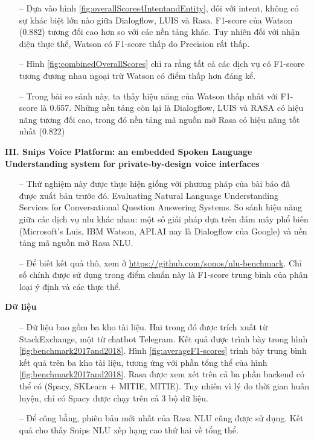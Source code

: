 \begin{itemize}
    \item[--] Dựa vào hình \ref{fig:overallScores4IntentandEntity}, đối với intent, không có sự khác biệt lớn nào giữa Dialogflow, LUIS và Rasa. F1-score của Watson (0.882) tương đối cao hơn so với các nền tảng khác. Tuy nhiên đối với nhận diện thực thể, Watson có F1-score thấp do Precision rất thấp.
    \item[--] Hình \ref{fig:combinedOverallScores} chỉ ra rằng tất cả các dịch vụ có F1-score tương đương nhau ngoại trừ Watson có điểm thấp hơn đáng kể.
    \item[--] Trong bài so sánh này, ta thấy hiệu năng của Watson thấp nhất với F1-score là 0.657. Những nền tảng còn lại là Dialogflow, LUIS và RASA có hiệu năng tương đối cao, trong đó nền tảng mã nguồn mở Rasa có hiệu năng tốt nhất (0.822)
\end{itemize}

\textbf{III. Snips Voice Platform: an embedded Spoken Language Understanding system for private-by-design voice interfaces}

\begin{itemize}
    \item[--] Thử nghiệm này được thực hiện giống với phương pháp của bài báo đã được xuất bản trước đó. Evaluating Natural Language Understanding Services for Conversational Question Answering Systems. So sánh hiệu năng giữa các dịch vụ \ac{nlu} khác nhau: một số giải pháp dựa trên đám mây phổ biến (Microsoft’s Luis, IBM Watson, API.AI nay là Dialogflow của Google) và nền tảng mã nguồn mở Rasa NLU.
    \item[--] Để biết kết quả thô, xem ở \url{https://github.com/sonos/nlu-benchmark}. Chỉ số chính được sử dụng trong điểm chuẩn này là F1-score trung bình của phân loại ý định và các thực thể.
\end{itemize}

\textbf{Dữ liệu}
\begin{itemize}
    \item[--] Dữ liệu bao gồm ba kho tài liệu. Hai trong đó được trích xuất từ StackExchange, một từ chatbot Telegram. Kết quả được trình bày trong hình \ref{fig:benchmark2017and2018}. Hình \ref{fig:averageF1-scores} trình bày trung bình kết quả trên ba kho tài liệu, tương ứng với phần tổng thể của hình \ref{fig:benchmark2017and2018}. Rasa được xem xét trên cả ba phần backend có thể có (Spacy, SKLearn + MITIE, MITIE). Tuy nhiên vì lý do thời gian huấn luyện, chỉ có Spacy được chạy trên cả 3 bộ dữ liệu.
    \item[--] Để công bằng, phiên bản mới nhất của Rasa NLU cũng được sử dụng. Kết quả cho thấy Snips NLU xếp hạng cao thứ hai về tổng thể.
\end{itemize}


